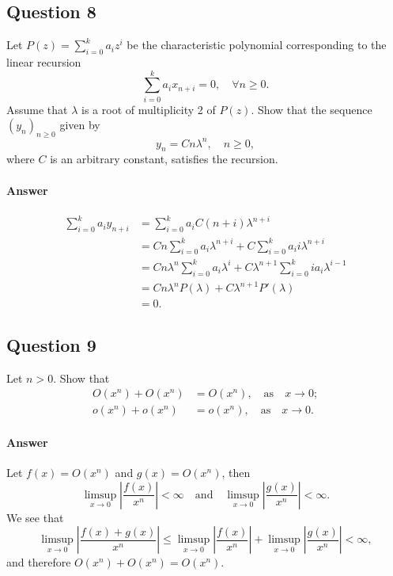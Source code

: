 \subsection{Question 8}
Let $ P(z) = \sum_{i=0}^{k} a_i z^i $ be the characteristic polynomial corresponding to the linear recursion
\begin{equation*}
    \sum_{i=0}^{k} a_i x_{n + i} = 0, \quad \forall n \geq 0.
\end{equation*}
Assume that $ \lambda $ is a root of multiplicity 2 of $ P(z) $.
Show that the sequence $ (y_n)_{n \geq 0} $ given by
\begin{equation*}
    y_n = C n \lambda^n, \quad n \geq 0,
\end{equation*}
where $ C $ is an arbitrary constant, satisfies the recursion.

\paragraph{Answer}
\begin{align*}
    \sum_{i=0}^{k} a_i y_{n + i} &= \sum_{i=0}^{k} a_i C (n + i) \lambda^{n + i} \\
                                 &= C n \sum_{i=0}^{k} a_i \lambda^{n + i} + C \sum_{i=0}^{k} a_i i \lambda^{n + i} \\
                                 &= C n \lambda^n \sum_{i=0}^{k} a_i \lambda^i + C \lambda^{n + 1} \sum_{i=0}^{k} i a_i \lambda^{i - 1} \\
                                 &= C n \lambda^n P(\lambda) + C \lambda^{n + 1} P'(\lambda) \\
                                 &= 0.
\end{align*}

\subsection{Question 9}
Let $ n > 0 $. Show that
\begin{align*}
    O(x^n) + O(x^n) &= O(x^n), \quad \text{as} \quad x \rightarrow 0; \\
    o(x^n) + o(x^n) &= o(x^n), \quad \text{as} \quad x \rightarrow 0.
\end{align*}

\paragraph{Answer}
Let $ f(x) = O(x^n) $ and $ g(x) = O(x^n) $, then
\begin{equation*}
    \limsup_{x \rightarrow 0} \left| \frac{f(x)}{x^n} \right| < \infty \quad \text{and} \quad \limsup_{x \rightarrow 0} \left| \frac{g(x)}{x^n} \right| < \infty.
\end{equation*}
We see that
\begin{equation*}
    \limsup_{x \rightarrow 0} \left| \frac{f(x) + g(x)}{x^n} \right| \leq \limsup_{x \rightarrow 0} \left| \frac{f(x)}{x^n} \right| + \limsup_{x \rightarrow 0} \left| \frac{g(x)}{x^n} \right| < \infty,
\end{equation*}
and therefore $ O(x^n) + O(x^n) = O(x^n) $.

